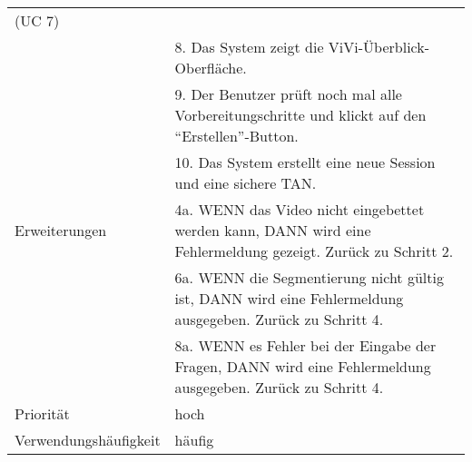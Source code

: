 \begin{tabularx}{\linewidth}{|l|X|}
							  (UC 7) \\
							& 8. Das System zeigt die ViVi-Überblick-Oberfläche. \\ 
							& 9. Der Benutzer prüft noch mal alle Vorbereitungschritte und 
							  klickt auf den ``Erstellen''-Button. \\
							& 10. Das System erstellt eine neue Session und eine sichere TAN. \\ 
							  \hline
	Erweiterungen			& 4a. WENN das Video nicht eingebettet werden kann, DANN wird eine 
	                          Fehlermeldung gezeigt. Zurück zu Schritt 2. \\
							& 6a. WENN die Segmentierung nicht gültig ist, DANN wird eine 
							  Fehlermeldung ausgegeben. Zurück zu Schritt 4.\\
							& 8a. WENN es Fehler bei der Eingabe der Fragen, DANN wird 
							  eine Fehlermeldung ausgegeben. Zurück zu Schritt 4. \\ \hline
	Priorität				& hoch \\ \hline
	Verwendungshäufigkeit	& häufig \\ \hline
\end{tabularx}